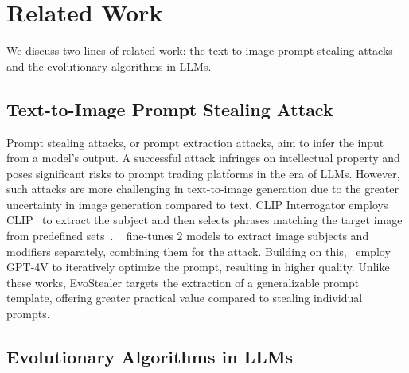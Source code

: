 \section{Related Work}

We discuss two lines of related work: the text-to-image prompt stealing attacks and the evolutionary algorithms in LLMs.


\subsection{Text-to-Image Prompt Stealing Attack}
Prompt stealing attacks, or prompt extraction attacks, aim to infer the input from a model's output. A successful attack infringes on intellectual property and poses significant risks to prompt trading platforms in the era of LLMs. However, such attacks are more challenging in text-to-image generation due to the greater uncertainty in image generation compared to text. CLIP Interrogator employs CLIP~\citep{radford2021learning} to extract the subject and then selects phrases matching the target image from predefined sets~\citep{udo2023image}. ~\citet{shen2024prompt} fine-tunes 2 models to extract image subjects and modifiers separately, combining them for the attack. Building on this,~\citet{naseh2024iteratively} employ GPT-4V to iteratively optimize the prompt, resulting in higher quality. Unlike these works, EvoStealer targets the extraction of a generalizable prompt template, offering greater practical value compared to stealing individual prompts.



\subsection{Evolutionary Algorithms in LLMs}

